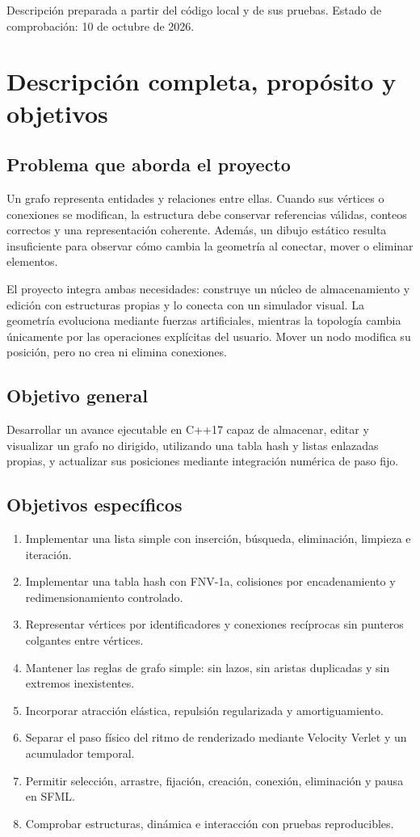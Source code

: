 \documentclass[11pt,a4paper]{article}
\begin{document}
\vfill
{\small Descripción preparada a partir del código local y de sus pruebas. Estado de comprobación: 10 de octubre de 2026.}
\newpage

\section{Descripción completa, propósito y objetivos}
\subsection{Problema que aborda el proyecto}
Un grafo representa entidades y relaciones entre ellas. Cuando sus vértices o conexiones se modifican, la estructura debe conservar referencias válidas, conteos correctos y una representación coherente. Además, un dibujo estático resulta insuficiente para observar cómo cambia la geometría al conectar, mover o eliminar elementos.

El proyecto integra ambas necesidades: construye un núcleo de almacenamiento y edición con estructuras propias y lo conecta con un simulador visual. La geometría evoluciona mediante fuerzas artificiales, mientras la topología cambia únicamente por las operaciones explícitas del usuario. Mover un nodo modifica su posición, pero no crea ni elimina conexiones.

\subsection{Objetivo general}
Desarrollar un avance ejecutable en C++17 capaz de almacenar, editar y visualizar un grafo no dirigido, utilizando una tabla hash y listas enlazadas propias, y actualizar sus posiciones mediante integración numérica de paso fijo.

\subsection{Objetivos específicos}
\begin{enumerate}
\item Implementar una lista simple con inserción, búsqueda, eliminación, limpieza e iteración.
\item Implementar una tabla hash con FNV-1a, colisiones por encadenamiento y redimensionamiento controlado.
\item Representar vértices por identificadores y conexiones recíprocas sin punteros colgantes entre vértices.
\item Mantener las reglas de grafo simple: sin lazos, sin aristas duplicadas y sin extremos inexistentes.
\item Incorporar atracción elástica, repulsión regularizada y amortiguamiento.
\item Separar el paso físico del ritmo de renderizado mediante Velocity Verlet y un acumulador temporal.
\item Permitir selección, arrastre, fijación, creación, conexión, eliminación y pausa en SFML.
\item Comprobar estructuras, dinámica e interacción con pruebas reproducibles.
\end{enumerate}
\end{document}
